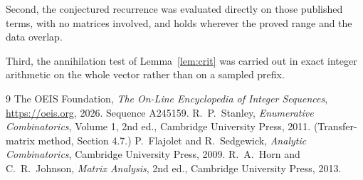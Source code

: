 \documentclass[11pt,a4paper]{article}
\theoremstyle{plain}
\theoremstyle{definition}
\begin{document}
Second, the conjectured recurrence was evaluated directly on those published terms, with no
matrices involved, and holds wherever the proved range and the data overlap.

Third, the annihilation test of Lemma~\ref{lem:crit} was carried out in exact integer
arithmetic on the whole vector rather than on a sampled prefix.

\begin{thebibliography}{9}
 The OEIS Foundation, \emph{The On-Line Encyclopedia of Integer
Sequences}, \url{https://oeis.org}, 2026. Sequence A245159.
 R.~P.~Stanley, \emph{Enumerative Combinatorics}, Volume 1, 2nd ed.,
Cambridge University Press, 2011. (Transfer-matrix method, Section 4.7.)
 P.~Flajolet and R.~Sedgewick, \emph{Analytic Combinatorics}, Cambridge
University Press, 2009.
 R.~A.~Horn and C.~R.~Johnson, \emph{Matrix Analysis}, 2nd ed., Cambridge
University Press, 2013.
\end{thebibliography}
\end{document}
